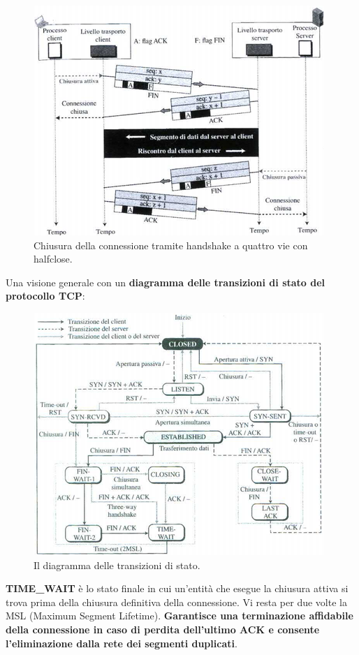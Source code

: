 \documentclass[11pt,a4paper]{article}
\theoremstyle{definition}
\begin{document}
\newpage
\begin{figure}[!h]
	\includegraphics[scale=0.5]{Immagini/Halfway.png}
	\centering
	\caption{Chiusura della connessione tramite handshake a quattro vie con halfclose.}
\end{figure}
Una visione generale con un \textbf{diagramma delle transizioni di stato del protocollo TCP}:
\begin{figure}[!h]
	\includegraphics[scale=0.7]{Immagini/ASFTCP.png}
	\centering
	\caption{Il diagramma delle transizioni di stato.}
\end{figure}\newline
\textbf{TIME\_WAIT} è lo stato finale in cui un'entità che esegue la
chiusura attiva si trova prima della chiusura definitiva della connessione. Vi resta per due volte la MSL (Maximum Segment Lifetime). \textbf{Garantisce una terminazione affidabile della connessione in caso di perdita dell'ultimo ACK e consente l'eliminazione dalla rete dei segmenti duplicati}.
\end{document}
